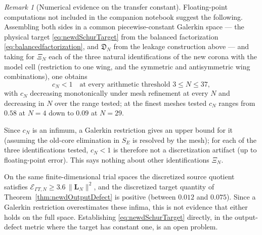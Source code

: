 \documentclass[11pt]{amsart}
\theoremstyle{definition}
\theoremstyle{remark}
\newtheorem{remark}[theorem]{Remark}
\begin{document}
\begin{remark}[Numerical evidence on the transfer constant]
\label{rem:newdTransferMeasured}
Floating-point computations not included in the companion notebook suggest
the following.  Assembling both sides in a common
piecewise-constant Galerkin space --- the physical target
\eqref{eq:newdSchurTarget} from the balanced factorization
\eqref{eq:balancedfactorization}, and \(\mathfrak D_N\) from the leakage
construction above --- and taking for \(\Xi_N\) each of the three natural
identifications of the new corona with the model cell (restriction to one
wing, and the symmetric and antisymmetric wing combinations), one obtains
\[
 c_N<1\quad\text{at every arithmetic threshold }3\le N\le37,
\]
with \(c_N\) decreasing monotonically under mesh refinement at every \(N\) and
decreasing in \(N\) over the range tested; at the finest meshes tested
\(c_N\) ranges from \(0.58\) at \(N=4\) down to \(0.09\) at \(N=29\).

Since \(c_N\) is an infimum, a Galerkin restriction gives an upper bound for
it (assuming the old-core elimination in \(S_E\) is resolved by the mesh); for each of the three identifications tested, \(c_N<1\) is therefore not
a discretization artifact (up to floating-point error).  This says nothing
about other identifications \(\Xi_N\).

On the same finite-dimensional trial spaces the discretized source quotient
satisfies \(\mathcal E_{\Gamma T,N}\ge3.6\,\|\mathbf L_N\|^2\), and the
discretized target quantity of Theorem~\ref{thm:newdOutputDefect} is
positive (between \(0.012\) and \(0.075\)).  Since a Galerkin restriction
overestimates these infima, this is not evidence that either holds on the
full space.  Establishing \eqref{eq:newdSchurTarget} directly, in the
output-defect metric where the target has constant one, is an open
problem.
\end{remark}
\end{document}
